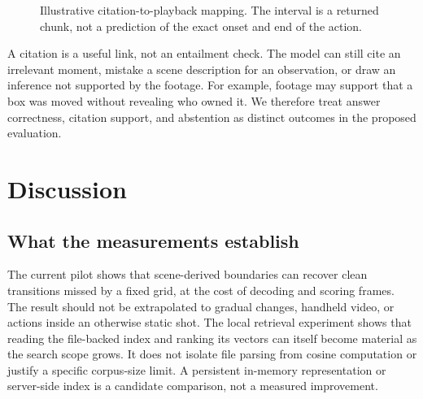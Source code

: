 \documentclass{ieeeaccess}
\begin{document}
\begin{figure}[!t]
\centering
{}
\caption{Illustrative citation-to-playback mapping. The interval is a returned
chunk, not a prediction of the exact onset and end of the action.}
\label{fig:evidence}
\end{figure}

A citation is a useful link, not an entailment check. The model can still cite an irrelevant moment, mistake a scene description for an observation, or draw an inference not supported by the footage. For example, footage may support that a box was moved without revealing who owned it. We therefore treat answer correctness, citation support, and abstention as distinct outcomes in the proposed evaluation.



\section{Discussion}
\label{sec:discussion}
\subsection{What the measurements establish}
The current pilot shows that scene-derived boundaries can recover clean transitions missed by a fixed grid, at the cost of decoding and scoring frames. The result should not be extrapolated to gradual changes, handheld video, or actions inside an otherwise static shot. The local retrieval experiment shows that reading the file-backed index and ranking its vectors can itself become material as the search scope grows. It does not isolate file parsing from cosine computation or justify a specific corpus-size limit. A persistent in-memory representation or server-side index is a candidate comparison, not a measured improvement.
\end{document}

